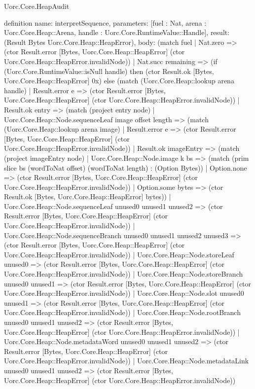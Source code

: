 \begin{lexlean}{Uorc.Core.HeapAudit}
\begin{semanticmodule}
definition{
  name: interpretSequence,
  parameters: [fuel : Nat, arena : Uorc.Core.Heap::Arena, handle : Uorc.Core.RuntimeValue::Handle],
  result: (Result Bytes Uorc.Core.Heap::HeapError),
  body: (match fuel
    | Nat.zero => (ctor Result.error [Bytes, Uorc.Core.Heap::HeapError] (ctor Uorc.Core.Heap::HeapError.invalidNode))
    | Nat.succ remaining => (if (Uorc.Core.RuntimeValue::isNull handle) then (ctor Result.ok [Bytes, Uorc.Core.Heap::HeapError] 0x) else (match (Uorc.Core.Heap::lookup arena handle)
      | Result.error e => (ctor Result.error [Bytes, Uorc.Core.Heap::HeapError] (ctor Uorc.Core.Heap::HeapError.invalidNode))
      | Result.ok entry => (match (project entry node)
        | Uorc.Core.Heap::Node.sequenceLeaf image offset length => (match (Uorc.Core.Heap::lookup arena image)
          | Result.error e => (ctor Result.error [Bytes, Uorc.Core.Heap::HeapError] (ctor Uorc.Core.Heap::HeapError.invalidNode))
          | Result.ok imageEntry => (match (project imageEntry node)
            | Uorc.Core.Heap::Node.image k bs => (match (prim slice bs (wordToNat offset) (wordToNat length) : (Option Bytes))
              | Option.none => (ctor Result.error [Bytes, Uorc.Core.Heap::HeapError] (ctor Uorc.Core.Heap::HeapError.invalidNode))
              | Option.some bytes => (ctor Result.ok [Bytes, Uorc.Core.Heap::HeapError] bytes))
            | Uorc.Core.Heap::Node.sequenceLeaf unused0 unused1 unused2 => (ctor Result.error [Bytes, Uorc.Core.Heap::HeapError] (ctor Uorc.Core.Heap::HeapError.invalidNode))
            | Uorc.Core.Heap::Node.sequenceBranch unused0 unused1 unused2 unused3 => (ctor Result.error [Bytes, Uorc.Core.Heap::HeapError] (ctor Uorc.Core.Heap::HeapError.invalidNode))
            | Uorc.Core.Heap::Node.storeLeaf unused0 => (ctor Result.error [Bytes, Uorc.Core.Heap::HeapError] (ctor Uorc.Core.Heap::HeapError.invalidNode))
            | Uorc.Core.Heap::Node.storeBranch unused0 unused1 => (ctor Result.error [Bytes, Uorc.Core.Heap::HeapError] (ctor Uorc.Core.Heap::HeapError.invalidNode))
            | Uorc.Core.Heap::Node.slot unused0 unused1 => (ctor Result.error [Bytes, Uorc.Core.Heap::HeapError] (ctor Uorc.Core.Heap::HeapError.invalidNode))
            | Uorc.Core.Heap::Node.rootBranch unused0 unused1 unused2 => (ctor Result.error [Bytes, Uorc.Core.Heap::HeapError] (ctor Uorc.Core.Heap::HeapError.invalidNode))
            | Uorc.Core.Heap::Node.metadataWord unused0 unused1 unused2 => (ctor Result.error [Bytes, Uorc.Core.Heap::HeapError] (ctor Uorc.Core.Heap::HeapError.invalidNode))
            | Uorc.Core.Heap::Node.metadataLink unused0 unused1 unused2 => (ctor Result.error [Bytes, Uorc.Core.Heap::HeapError] (ctor Uorc.Core.Heap::HeapError.invalidNode))
}
\end{semanticmodule}
\end{lexlean}
